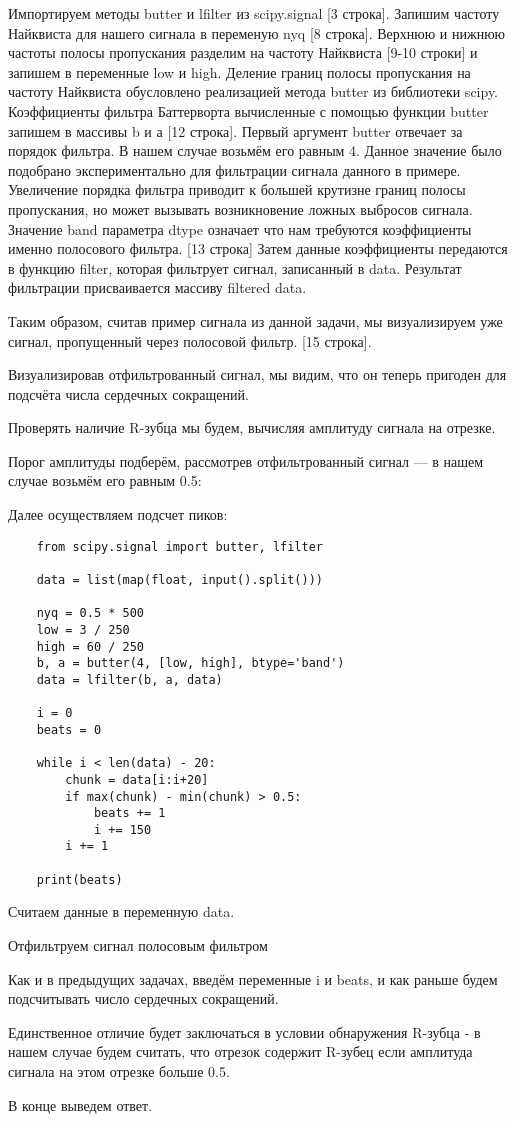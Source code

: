 Импортируем методы butter и lfilter из scipy.signal [3 строка]. Запишим частоту Найквиста для нашего сигнала в переменую nyq [8 строка]. Верхнюю и нижнюю частоты полосы пропускания разделим на частоту Найквиста [9-10 строки] и запишем в переменные low и high. Деление границ полосы пропускания на частоту Найквиста обусловлено реализацией метода butter из библиотеки scipy. Коэффициенты фильтра Баттерворта вычисленные с помощью функции butter запишем в массивы b и а [12 строка]. Первый аргумент butter отвечает за порядок фильтра. В нашем случае возьмём его равным 4. Данное значение было подобрано экспериментально для фильтрации сигнала данного в примере. Увеличение порядка фильтра приводит к большей крутизне границ полосы пропускания, но может вызывать возникновение ложных выбросов сигнала. Значение band параметра dtype означает что нам требуются коэффициенты именно полосового фильтра. [13 строка] Затем данные коэффициенты передаются в функцию filter, которая фильтрует сигнал, записанный в data. Результат фильтрации присваивается массиву filtered data.

Таким образом, считав пример сигнала из данной задачи, мы визуализируем уже сигнал, пропущенный через полосовой фильтр. [15 строка].

Визуализировав отфильтрованный сигнал, мы видим, что он теперь пригоден для подсчёта числа сердечных сокращений. 


Проверять наличие R-зубца мы будем, вычисляя амплитуду сигнала на отрезке. 

Порог амплитуды подберём, рассмотрев отфильтрованный сигнал — в нашем случае возьмём его равным 0.5:


Далее осуществляем подсчет пиков:

\begin{verbatim}
    from scipy.signal import butter, lfilter

    data = list(map(float, input().split()))

    nyq = 0.5 * 500
    low = 3 / 250
    high = 60 / 250
    b, a = butter(4, [low, high], btype='band')
    data = lfilter(b, a, data)

    i = 0
    beats = 0

    while i < len(data) - 20:
        chunk = data[i:i+20]
        if max(chunk) - min(chunk) > 0.5:
            beats += 1
            i += 150
        i += 1

    print(beats)
\end{verbatim}

Считаем данные в переменную data.

Отфильтруем сигнал полосовым фильтром

Как и в предыдущих задачах, введём переменные i и beats, и как раньше будем подсчитывать число сердечных сокращений. 

Единственное отличие будет заключаться в условии обнаружения R-зубца - в нашем случае будем считать, что отрезок содержит R-зубец если амплитуда сигнала на этом отрезке больше 0.5.

В конце выведем ответ.

